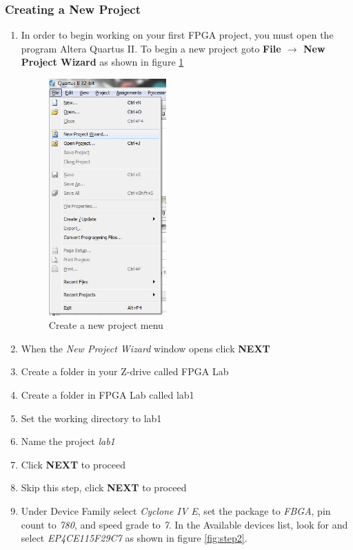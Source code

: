 \subsubsection{Creating a New Project}
\begin{enumerate}
	\item In order to begin working on your first FPGA project, you must open the program Altera Quartus II. To begin a new project goto  {\bf File $\rightarrow$ New Project Wizard} as shown in figure \ref{fig:step1}


\begin{figure}[H]
	\centering
	\includegraphics[width=45mm]{Lab1/figures/step1.png}
	\caption{Create a new project menu}
	\label{fig:step1}
\end{figure}

	\item When the \emph{New Project Wizard} window opens click {\bf NEXT}

	\item Create a folder in your Z-drive called FPGA Lab

	\item Create a folder in FPGA Lab called lab1

	\item Set the working directory to lab1

	\item Name the project \emph{lab1}

	\item Click {\bf NEXT} to proceed

	\item Skip this step, click  {\bf NEXT} to proceed

	\item Under Device Family select \emph{Cyclone IV E}, set the package to \emph{FBGA}, pin count to \emph{780}, and speed grade to \emph{7}. In the Available devices list, look for and select \emph{EP4CE115F29C7} as shown in figure \ref{fig:step2}.
	


\end{enumerate}
